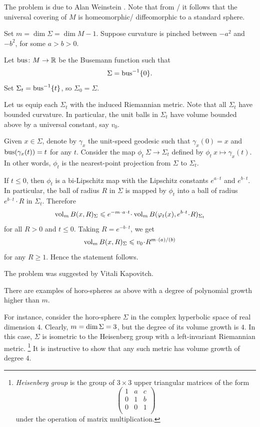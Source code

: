 The problem is due to Alan Weinstein \cite{weinstein}.
Note that from \cite{micallef-moore}/\cite{boehm-wilking} it follows that the universal covering of $M$ is homeomorphic/\hskip0mm diffeomorphic to a standard sphere.



Set $m=\dim \Sigma=\dim M-1$.
Suppose curvature is pinched between $-a^2$ and $-b^2$, for some $a>b>0$.

Let $\operatorname{\rm bus}\nolimits\colon M\to\mathbb{R}$ be the Busemann function such that 
\[\Sigma=\operatorname{\rm bus}\nolimits^{-1}\{0\}.\]
Set  $\Sigma_t=\operatorname{\rm bus}\nolimits^{-1}\{t\}$, so $\Sigma_0=\Sigma$.

Let us equip each $\Sigma_t$ with the induced Riemannian metric.
Note that all $\Sigma_t$ have bounded curvature.
In particular, the unit balls in $\Sigma_t$ have volume bounded above by a universal constant, say $v_0$.
 
Given $x\in \Sigma$, denote by $\gamma_x$ 
the unit-speed geodesic
such that $\gamma_x(0)=x$ and $\operatorname{\rm bus}\nolimits(\gamma_x(t))=t$ for any $t$.
Consider the map $\phi_{t}\:\Sigma\to\Sigma_t$ defined by
$\phi_t\:x\mapsto \gamma_x(t)$.
In other words, $\phi_{t}$ is the nearest-point projection from $\Sigma$ to $\Sigma_t$.

If $t\le 0$, then $\phi_t$ is a bi-Lipschitz map with the Lipschitz constants $e^{a\cdot t}$ and $e^{b\cdot t}$.
In particular, the ball of radius $R$ in $\Sigma$ is mapped by $\phi_t$
into a ball of radius $e^{b\cdot t}\cdot R$ in $\Sigma_t$.
Therefore
\[\vol_m B(x,R)_\Sigma
\le 
e^{-m\cdot a\cdot t}\cdot \vol_m B(\phi_t(x),e^{b\cdot t}\cdot R)_{\Sigma_t}\]
for all $R>0$ and $t\le 0$.
Taking $R=e^{-b\cdot t}$, we get
\[\vol_m B(x,R)_\Sigma\le v_0\cdot R^{m\cdot \frac ab}\]
for any $R\ge1$. 
Hence the statement follows.
\qeds

The problem was suggested by Vitali Kapovitch.

There are examples of horo-spheres as above with a degree of polynomial growth higher than $m$.

For instance, consider the horo-sphere $\Sigma$ in the complex hyperbolic space
of real dimension $4$.
Clearly, $m=\dim \Sigma\z=3$, but the degree of its volume growth is $4$.
In this case, $\Sigma$ is isometric to the Heisenberg group with a left-invariant Riemannian metric.%
\footnote{\emph{Heisenberg group}
is the group of $3\times3$ upper triangular matrices of the form
\[\begin{pmatrix}
 1 & a & c\\
 0 & 1 & b\\
 0 & 0 & 1\\
\end{pmatrix}\]
under the operation of matrix multiplication.} 
It is instructive to show that any such metric has volume  growth of degree $4$.

